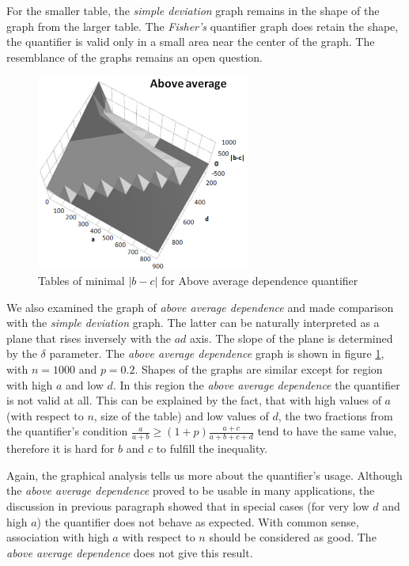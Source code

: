For the smaller table, the \emph{simple deviation} graph remains in the shape of the graph from the larger table. The \emph{Fisher's} quantifier graph does retain the shape, the quantifier is valid only in a small area near the center of the graph. The resemblance of the graphs remains an open question. 

\begin{figure}[h]
\centering
\includegraphics[width=70mm]{AA.eps}
\caption{Tables of minimal $|b-c|$ for Above average dependence quantifier}
\label{fig:AA}
\end{figure}

We also examined the graph of \emph{above average dependence} and made comparison with the \emph{simple deviation} graph. The latter can be naturally interpreted as a plane that rises inversely with the $ad$ axis. The slope of the plane is determined by the $\delta$ parameter. The \emph{above average dependence} graph is shown in figure \ref{fig:AA}, with $n=1000$ and $p=0.2$. Shapes of the graphs are similar except for region with high $a$ and low $d$. In this region the \emph{above average dependence} the quantifier is not valid at all. This can be explained by the fact, that with high values of $a$ (with respect to $n$, size of the table) and low values of $d$, the two fractions from the quantifier's condition $ \frac{a}{a+b} \geq (1+p) \frac{a+c}{a+b+c+d} $ tend to have the same value, therefore it is hard for $b$ and $c$ to fulfill the inequality. 

Again, the graphical analysis tells us more about the quantifier's usage. Although the \emph{above average dependence} proved to be usable in many applications, the discussion in previous paragraph showed that in special cases (for very low $d$ and high $a$) the quantifier does not behave as expected. With common sense, association with high $a$ with respect to $n$ should be considered as good. The \emph{above average dependence} does not give this result. 